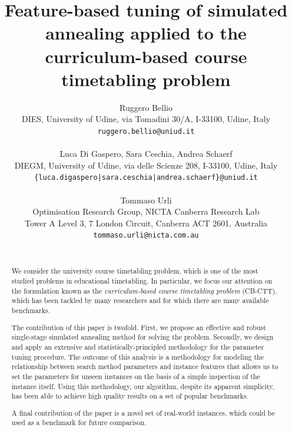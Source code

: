 \documentclass[authoryear,12pt]{article}
\title{Feature-based tuning of simulated annealing applied to the curriculum-based course timetabling problem}
\author{Ruggero Bellio\\
\small{DIES, University of Udine, via Tomadini 30/A, I-33100, Udine, Italy}\\
\small{\texttt{ruggero.bellio@uniud.it}}\\ \\
Luca Di Gaspero, Sara Ceschia, Andrea Schaerf\\
\small{DIEGM, University of Udine, via delle Scienze 208, I-33100, Udine, Italy}\\
\small{\texttt{\{luca.digaspero|sara.ceschia|andrea.schaerf\}@uniud.it}}\\ \\
Tommaso Urli\\
\small{Optimisation Research Group, NICTA Canberra Research Lab}\\
\small{Tower A Level 3, 7 London Circuit, Canberra ACT 2601, Australia}\\
\small{\texttt{tommaso.urli@nicta.com.au}}\\ \\
}
\date{}
\newcommand{\cbctt}{CB-CTT}
\begin{document}
\maketitle





  \begin{abstract}
    We consider the university course timetabling problem, which is one of the
    most studied problems in educational timetabling. In particular, we focus
    our attention on the formulation known as the \emph{curriculum-based course
    timetabling problem} (\cbctt{}), which has been tackled by many researchers
    and for which there are many available benchmarks.

    The contribution of this paper is twofold. First, we propose an effective
    and robust single-stage simulated annealing method for solving the problem.
    Secondly, we design and apply an extensive and statistically-principled
    methodology for the parameter tuning procedure.  The outcome of this
    analysis is a methodology for modeling the relationship between search
    method parameters and instance features that allows us to set the parameters
    for unseen instances on the basis of a simple inspection of the instance
    itself.
    Using this methodology, our algorithm, despite its apparent simplicity, has
    been able to achieve high quality results on a set of popular benchmarks.

    A final contribution of the paper is a novel set of real-world instances,
    which could be used as a benchmark for future comparison.
  \end{abstract}
\end{document}
